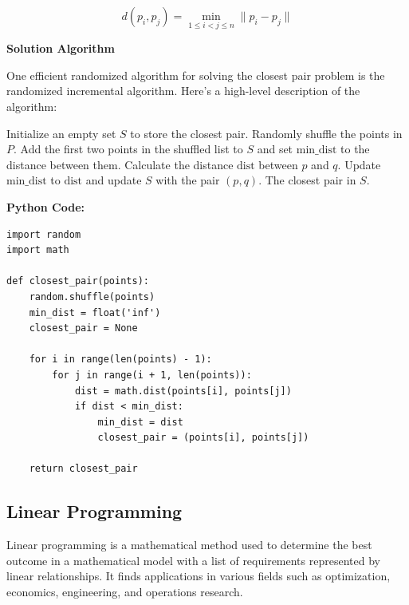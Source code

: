 \documentclass[12pt]{book} %
\begin{document}
\[
d(p_i, p_j) = \min_{1 \leq i < j \leq n} \| p_i - p_j \|
\]

\textbf{Solution Algorithm}

One efficient randomized algorithm for solving the closest pair problem is the randomized incremental algorithm. Here's a high-level description of the algorithm:
\FloatBarrier
\begin{algorithm}
\caption{Randomized Incremental Algorithm for Closest Pair}
\begin{algorithmic}[1]
\State Initialize an empty set \( S \) to store the closest pair.
\State Randomly shuffle the points in \( P \).
\State Add the first two points in the shuffled list to \( S \) and set \( \text{min\_dist} \) to the distance between them.
        \State Calculate the distance \( \text{dist} \) between \( p \) and \( q \).
            \State Update \( \text{min\_dist} \) to \( \text{dist} \) and update \( S \) with the pair \( (p, q) \).
        \EndIf
    \EndFor
\EndFor
\Return The closest pair in \( S \).
\end{algorithmic}
\end{algorithm}
\FloatBarrier
\textbf{Python Code:}
\FloatBarrier
\begin{lstlisting}
import random
import math

def closest_pair(points):
    random.shuffle(points)
    min_dist = float('inf')
    closest_pair = None
    
    for i in range(len(points) - 1):
        for j in range(i + 1, len(points)):
            dist = math.dist(points[i], points[j])
            if dist < min_dist:
                min_dist = dist
                closest_pair = (points[i], points[j])
    
    return closest_pair
\end{lstlisting}
\FloatBarrier

\subsection{Linear Programming}

Linear programming is a mathematical method used to determine the best outcome in a mathematical model with a list of requirements represented by linear relationships. It finds applications in various fields such as optimization, economics, engineering, and operations research.
\end{document}
